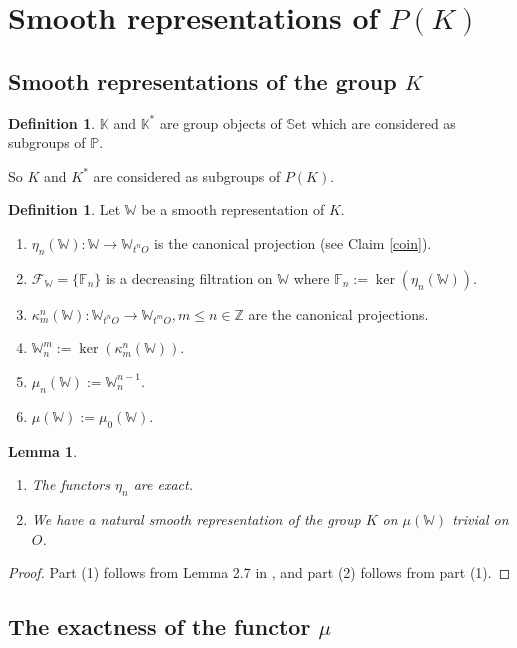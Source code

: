 \documentclass[11pt,a4paper,twoside]{amsart}
\newtheorem{lemma}[theorem]{Lemma}
\theoremstyle{definition}
\newtheorem{definition}[theorem]{Definition}
\theoremstyle{remark}
\newcommand{\mF}{\mathbb F}
\newcommand{\mK}{\mathbb K}
\newcommand{\mP}{\mathbb P}
\newcommand{\mW}{\mathbb W}
\newcommand{\mZ}{\mathbb Z}
\newcommand{\kk}{\kappa}
\newcommand{\mcF}{\mathcal F}
\newcommand{\mSet}{\mathbb{S}\mathrm{et}}
\begin{document}
\section{Smooth representations of $P(K)$}\label{P(K)}

\subsection{Smooth representations of the group $K$}
\begin{definition} $\mK$ and $\mK ^*$ are group objects of $\mSet$ which are considered as subgroups of $\mP$.
\end{definition}
So $K$ and $K^*$ are considered as subgroups of $P(K)$.

 \begin{definition}\label{cusp} Let $\mW$ be a smooth representation of $K$.
\begin{enumerate}
\item
$\eta _n (\mW):\mW \to \mW _ {t^nO}$ is the canonical projection (see Claim \ref{coin}).
\item $\mcF _\mW= \{\mF _n\}$ is a decreasing filtration on $\mW$ where
$ \mF _n := \ker (\eta _n(\mW))$.
\item
$\kk ^n_m(\mW):   \mW _ {t^nO} \to  \mW _ {t^mO}, m\leq n\in \mZ $ are the canonical projections.
\item $ \mW _n^m:= \ker ( \kk ^n_m(\mW)) $.
\item $\mu _n(\mW) :=  \mW ^{n-1}_n $.

\item $\mu (\mW):=  \mu _0 (\mW)$.
\end{enumerate} \end{definition}

\begin{lemma}\label{m} \begin{enumerate}

\item The functors $\eta_n$ are exact.

\item We have a natural smooth representation of the group $K$ on $\mu (\mW)$ trivial on $O$.
\end{enumerate}
\end{lemma}
\begin{proof} Part (1) follows from Lemma 2.7 in \cite{GK}, and part (2) follows from part (1).
\end{proof}

 \subsection{The exactness of the functor $\mu$}
\end{document}
